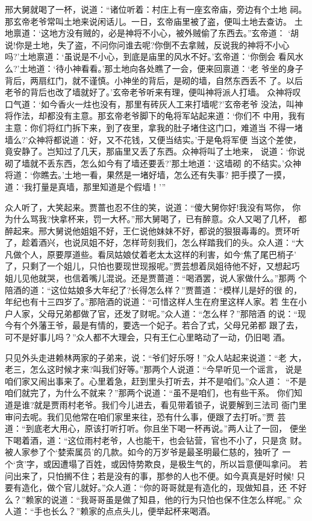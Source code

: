 邢大舅就喝了一杯，说道：“诸位听着：村庄上有一座玄帝庙，旁边有个土地
祠。那玄帝老爷常叫土地来说闲话儿。一日，玄帝庙里被了盗，便叫土地去查访。
土地禀道：‘这地方没有贼的，必是神将不小心，被外贼偷了东西去。”玄帝道：
‘胡说!你是土地，失了盗，不问你问谁去呢?你倒不去拿贼，反说我的神将不小心
吗?’土地禀道：‘虽说是不小心，到底是庙里的风水不好。’玄帝道：‘你倒会
看风水么?’土地道：‘待小神看看。’那土地向各处瞧了一会，便来回禀道：‘老
爷坐的身子背后，两扇红门，就不谨慎。小神坐的背后，是砌的墙，自然东西丢不
了。以后老爷的背后也改了墙就好了。’玄帝老爷听来有理，便叫神将派人打墙。
众神将叹口气道：‘如今香火一炷也没有，那里有砖灰人工来打墙呢?’玄帝老爷
没法，叫神将作法，却都没有主意。那玄帝老爷脚下的龟将军站起来道：‘你们不
中用，我有主意：你们将红门拆下来，到了夜里，拿我的肚子堵住这门口，难道当
不得一堵墙么?’众神将都说道：‘好，又不花钱，又便当结实。’于是龟将军便
当这个差使，竟安静了。岂知过了几天，那庙里又丢了东西。众神将叫了土地来，
说道：‘你说砌了墙就不丢东西，怎么如今有了墙还要丢?’那土地道：‘这墙砌
的不结实。’众神将道：‘你瞧去。’土地一看，果然是一堵好墙，怎么还有失事?
把手摸了一摸，道：‘我打量是真墙，那里知道是个假墙！’”

众人听了，大笑起来。贾蔷也忍不住的笑，说道：“傻大舅你好!我没有骂你，
你为什么骂我?快拿杯来，罚一大杯。”邢大舅喝了，已有醉意。众人又喝了几杯，
都醉起来。邢大舅说他姐姐不好，王仁说他妹妹不好，都说的狠狠毒毒的。贾环听
了，趁着酒兴，也说凤姐不好，怎样苛刻我们，怎么样踏我们的头。众人道：“大
凡做个人，原要厚道些。看凤姑娘仗着老太太这样的利害，如今‘焦了尾巴梢子’
了，只剩了一个姐儿，只怕也要现世现报呢。”贾芸想着凤姐待他不好，又想起巧
姐儿见他就哭，也信着嘴儿混说。还是贾蔷道：“喝酒罢，说人家做什么。”那两
个陪酒的道：“这位姑娘多大年纪了?长得怎么样？”贾蔷道：“模样儿是好的很
的，年纪也有十三四岁了。”那陪酒的说道：“可惜这样人生在府里这样人家。若
生在小户人家，父母兄弟都做了官，还发了财呢。”众人道：“怎么样？”那陪酒
的说：“现今有个外藩王爷，最是有情的，要选一个妃子。若合了式，父母兄弟都
跟了去，可不是好事儿吗？”众人都不大理会，只有王仁心里略动了一动，仍旧喝
酒。

只见外头走进赖林两家的子弟来，说：“爷们好乐呀！”众人站起来说道：“老
大，老三，怎么这时候才来?叫我们好等。”那两个人说道：“今早听见一个谣言，
说是咱们家又闹出事来了。心里着急，赶到里头打听去，并不是咱们。”众人道：
“不是咱们就完了，为什么不就来？”那两个说道：“虽不是咱们，也有些干系。
你们知道是谁?就是贾雨村老爷。我们今儿进去，看见带着锁子，说要解到三法司
衙门里审问去呢。我们见他常在咱们家里来往，恐有什么事，便跟了去打听。”贾
芸道：“到底老大用心，原该打听打听。你且坐下喝一杯再说。”两人让了一回，
便坐下喝着酒，道：“这位雨村老爷，人也能干，也会钻营，官也不小了，只是贪
财。被人家参了个‘婪索属员’的几款。如今的万岁爷是最圣明最仁慈的，独听了
一个‘贪’字，或因遭塌了百姓，或因恃势欺良，是极生气的，所以旨意便叫拿问。
若问出来了，只怕搁不住；若是没有的事，那参的人也不便。如今真真是好时候!
只要有造化，做个官儿就好。”众人道：“你的哥哥就是有造化的，现做知县，还
不好么？”赖家的说道：“我哥哥虽是做了知县，他的行为只怕也保不住怎么样呢。”
众人道：“手也长么？”赖家的点点头儿，便举起杯来喝酒。

